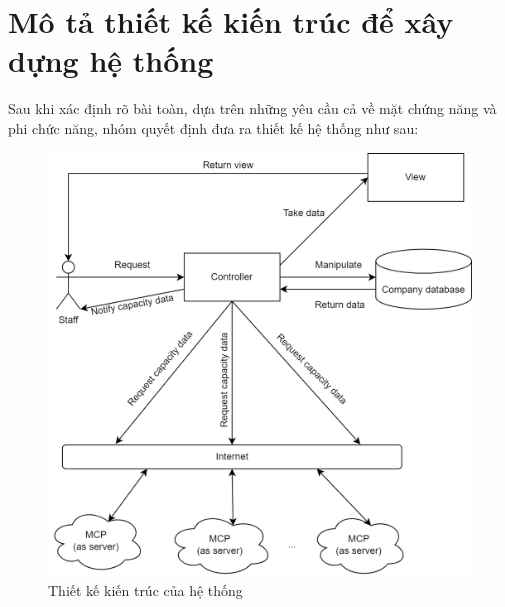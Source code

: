 \section{Mô tả thiết kế kiến trúc để xây dựng hệ thống}
    \quad Sau khi xác định rõ bài toàn, dựa trên những yêu cầu cả về mặt chứng năng và phi chức năng, nhóm quyết định đưa ra thiết kế hệ thống như sau:
   
    \vspace{1cm}
    \begin{figure}[h]
    	\centering
    	\includegraphics[width=1\linewidth]{imgs/architecture design.png}
    	\caption{Thiết kế kiến trúc của hệ thống}
    \end{figure}
   
